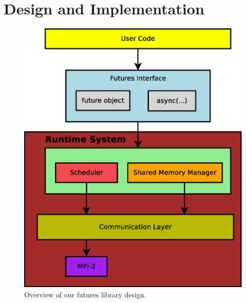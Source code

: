 \chapter{Design and Implementation}
\label{chap:implementation}

\begin{figure}[!ht]
\center
\includegraphics[width=0.7\columnwidth]{figures/system_overview}
\caption{Overview of our futures library design.}
\label{fig:system_overview}
\end{figure}

